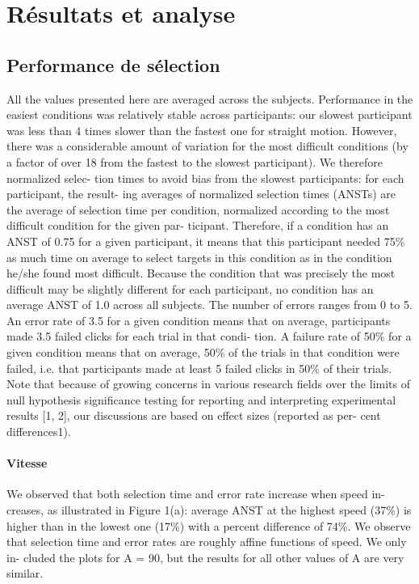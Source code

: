 \section{Résultats et analyse}
\subsection{Performance de sélection}
All the values presented here are averaged across the subjects. Performance in the
easiest conditions was relatively stable across participants: our slowest participant
was less than 4 times slower than the fastest one for straight motion. However, there
was a considerable amount of variation for the most difficult conditions (by a factor
of over 18 from the fastest to the slowest participant). We therefore normalized selec-
tion times to avoid bias from the slowest participants: for each participant, the result-
ing averages of normalized selection times (ANSTs) are the average of selection time
per condition, normalized according to the most difficult condition for the given par-
ticipant. Therefore, if a condition has an ANST of 0.75 for a given participant, it
means that this participant needed 75\%{} as much time on average to select targets in
this condition as in the condition he/she found most difficult. Because the condition
that was precisely the most difficult may be slightly different for each participant, no
condition has an average ANST of 1.0 across all subjects.
The number of errors ranges from 0 to 5. An error rate of 3.5 for a given condition
means that on average, participants made 3.5 failed clicks for each trial in that condi-
tion. A failure rate of 50\%{} for a given condition means that on average, 50\%{} of the
trials in that condition were failed, i.e. that participants made at least 5 failed clicks in
50\%{} of their trials. Note that because of growing concerns in various research fields
over the limits of null hypothesis significance testing for reporting and interpreting
experimental results [1, 2], our discussions are based on effect sizes (reported as per-
cent differences1).

\paragraph{Vitesse}
We observed that both selection time and error rate increase when speed in-
creases, as illustrated in Figure 1(a): average ANST at the highest speed (37\%{}) is
higher than in the lowest one (17\%{}) with a percent difference of 74\%{}. We observe
that selection time and error rates are roughly affine functions of speed. We only in-
cluded the plots for A = 90, but the results for all other values of A are very similar.

